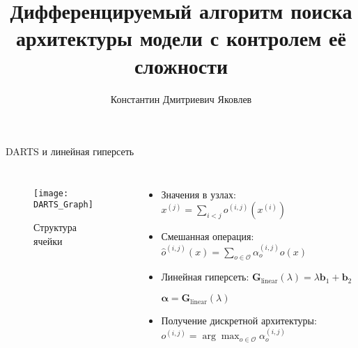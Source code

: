\documentclass{beamer}
\title[\hbox to 56mm{Алгоритм поиска архитектуры}]{Дифференцируемый алгоритм поиска архитектуры модели с контролем её сложности}
\author[К.\,Д. Яковлев]{Константин Дмитриевич Яковлев}
\institute{Московский физико-технический институт}
\date{\footnotesize
\par\smallskip\emph{Курс:} Автоматизация научных исследований\par (практика, В.\,В.~Стрижов)/Группа 874
\par\smallskip\emph{Эксперт:} В.\,В.~Стрижов
\par\smallskip\emph{Консультант:} О.\,С.~Гребенькова, ~ О.\,Ю.~Бахтеев
\par\bigskip\small 2021}
\begin{document}
\begin{frame}
\thispagestyle{empty}
\maketitle
\end{frame}
\begin{frame}{DARTS и линейная гиперсеть}

\begin{columns}[c]
\begin{figure}
	\texttt{[image: DARTS\_Graph]}
	\caption{Структура ячейки}
\end{figure}


\begin{itemize}
\item Значения в узлах: $x^{(j)} = \sum_{i < j}o^{(i, j)}(x^{(i)})$

\item Смешанная операция: $\hat{o}^{(i, j)}(x) = \sum_{o\in\mathcal{O}}\alpha^{(i, j)}_oo(x)$

\item Линейная гиперсеть: $\mathbf{G}_{\text{linear}}(\lambda) = \lambda\mathbf{b}_1 + \mathbf{b}_2$

$\mathbf{\alpha} = \mathbf{G}_\text{linear}(\lambda)$


\item Получение дискретной архитектуры:
$o^{(i, j)} = \arg\max_{o\in\mathcal{O}}\alpha_o^{(i, j)}$
\end{itemize}


\end{columns}
\end{frame}
\end{document}

